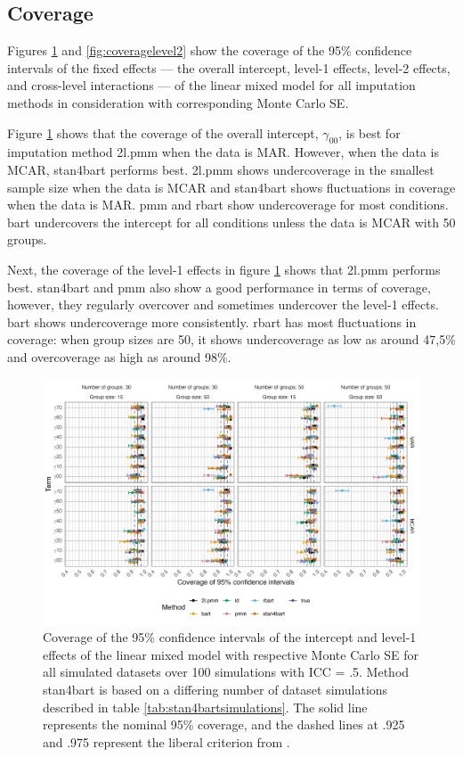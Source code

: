 \documentclass[3p,12pt,a4paper]{elsarticle}
\begin{document}
\subsection{Coverage}
Figures \ref{fig:coveragelevel1} and \ref{fig:coveragelevel2} show the coverage of the 95\% confidence intervals of the fixed effects --- the overall intercept, level-1 effects, level-2 effects, and cross-level interactions --- of the linear mixed model for all imputation methods in consideration with corresponding Monte Carlo SE.

Figure \ref{fig:coveragelevel1} shows that the coverage of the overall intercept, $\gamma_{00}$, is best for imputation method 2l.pmm when the data is MAR. However, when the data is MCAR, stan4bart performs best. 2l.pmm shows undercoverage in the smallest sample size when the data is MCAR and stan4bart shows fluctuations in coverage when the data is MAR. pmm and rbart show undercoverage for most conditions. bart undercovers the intercept for all conditions unless the data is MCAR with 50 groups.

Next, the coverage of the level-1 effects in figure \ref{fig:coveragelevel1} shows that 2l.pmm performs best. stan4bart and pmm also show a good performance in terms of coverage, however, they regularly overcover and sometimes undercover the level-1 effects. bart shows undercoverage more consistently. rbart has most fluctuations in coverage: when group sizes are 50, it shows undercoverage as low as around 47,5\% and overcoverage as high as around 98\%.

\begin{figure}[H]
    \centering
    \includegraphics[width=1\textwidth]{coveragelevel1.png}
    \caption{Coverage of the 95\% confidence intervals of the intercept and level-1 effects of the linear mixed model with respective Monte Carlo SE for all simulated datasets over 100 simulations with ICC = .5. Method stan4bart is based on a differing number of dataset simulations described in table \ref{tab:stan4bartsimulations}. The solid line represents the nominal 95\% coverage, and the dashed lines at .925 and .975 represent the liberal criterion from \citet{bradley1978}.}
    \label{fig:coveragelevel1}
\end{figure}
\end{document}
